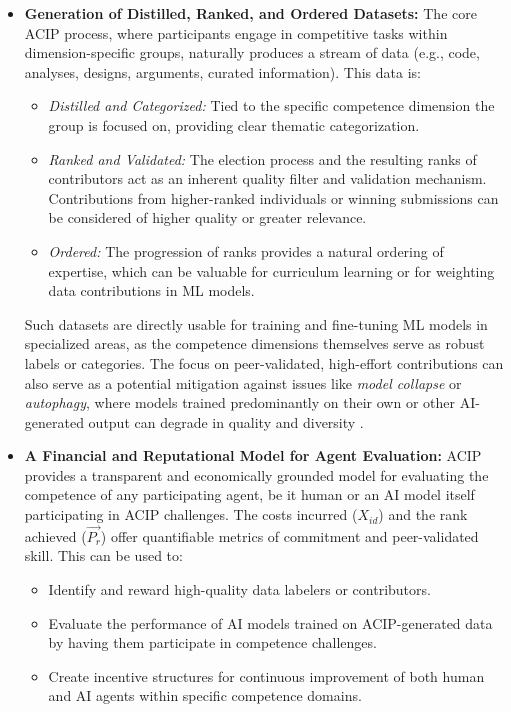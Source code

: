 \documentclass{article}
\begin{document}
\begin{CJK}{UTF8}{gbsn}
        \begin{itemize}
            \item \textbf{Generation of Distilled, Ranked, and Ordered Datasets:} The core ACIP process, where participants engage in competitive tasks within dimension-specific groups, naturally produces a stream of data (e.g., code, analyses, designs, arguments, curated information). This data is:
                  \begin{itemize}[label=\textbullet, leftmargin=*]
                      \item \textit{Distilled and Categorized:} Tied to the specific competence dimension the group is focused on, providing clear thematic categorization.
                      \item \textit{Ranked and Validated:} The election process and the resulting ranks of contributors act as an inherent quality filter and validation mechanism. Contributions from higher-ranked individuals or winning submissions can be considered of higher quality or greater relevance.
                      \item \textit{Ordered:} The progression of ranks provides a natural ordering of expertise, which can be valuable for curriculum learning or for weighting data contributions in ML models.
                  \end{itemize}
                  Such datasets are directly usable for training and fine-tuning ML models in specialized areas, as the competence dimensions themselves serve as robust labels or categories. {{The focus on peer-validated, high-effort contributions can also serve as a potential mitigation against issues like \textit{model collapse} or \textit{autophagy}, where models trained predominantly on their own or other AI-generated output can degrade in quality and diversity \cite{dohmatob2024strongmodelcollapse}.}}

            \item \textbf{A Financial and Reputational Model for Agent Evaluation:} ACIP provides a transparent and economically grounded model for evaluating the competence of any participating agent, be it human or an AI model itself participating in ACIP challenges. The costs incurred ($X_{id}$) and the rank achieved ($\vec{P_r}$) offer quantifiable metrics of commitment and peer-validated skill. This can be used to:
                  \begin{itemize}[label=\textbullet, leftmargin=*]
                      \item Identify and reward high-quality data labelers or contributors.
                      \item Evaluate the performance of AI models trained on ACIP-generated data by having them participate in competence challenges.
                      \item Create incentive structures for continuous improvement of both human and AI agents within specific competence domains.
                  \end{itemize}


\end{itemize}
\end{CJK}
\end{document}
